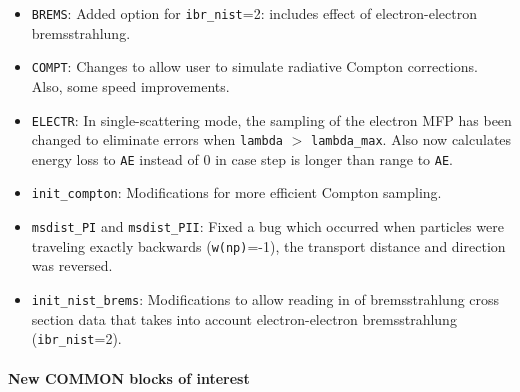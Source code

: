 \begin{itemize}

\item
{}
{\tt BREMS}: Added option for {\tt ibr\_nist}=2: includes effect of
electron-electron bremsstrahlung.

\item
{}
{\tt COMPT}: Changes to allow user to simulate radiative Compton corrections.
Also, some speed improvements.

\item
{}
{\tt ELECTR}: In single-scattering mode, the sampling of the electron
MFP has been changed to eliminate errors when {\tt lambda} $>$ {\tt lambda\_max}.  Also now calculates energy loss to {\tt AE} instead of 0 in case step
is longer than range to {\tt AE}.

\item
{}
{\tt init\_compton}: Modifications for more efficient Compton sampling.

\item
{}
{\tt msdist\_PI} and {\tt msdist\_PII}: Fixed a bug which occurred
when particles were traveling exactly backwards ({\tt w(np)}=-1), the
transport distance and direction was reversed.

\item
{}
{\tt init\_nist\_brems}: Modifications to allow reading in of
bremsstrahlung cross section data that takes into account electron-electron
bremsstrahlung ({\tt ibr\_nist}=2).

\end{itemize}


\paragraph{New COMMON blocks of interest}

